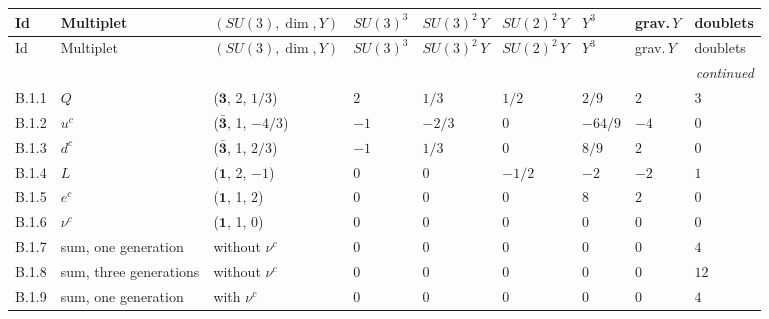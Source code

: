 {\scriptsize\setlength{\tabcolsep}{3pt}
\begin{longtable}{@{}lllllllll@{}}
\toprule
Id & Multiplet & $(SU(3),\dim, Y)$ & $SU(3)^3$ & $SU(3)^2\,Y$ & $SU(2)^2\,Y$ & $Y^3$ & grav.$\,Y$ & doublets \\
\midrule\endfirsthead
\toprule
Id & Multiplet & $(SU(3),\dim, Y)$ & $SU(3)^3$ & $SU(3)^2\,Y$ & $SU(2)^2\,Y$ & $Y^3$ & grav.$\,Y$ & doublets \\
\midrule\endhead
\midrule\multicolumn{9}{r}{\emph{continued}}\\\endfoot
\bottomrule\endlastfoot
B.1.1 & $Q$ & ($\mathbf{3}$, 2, $1/3$) & $2$ & $1/3$ & $1/2$ & $2/9$ & $2$ & $3$ \\
B.1.2 & $u^c$ & ($\bar{\mathbf{3}}$, 1, $-4/3$) & $-1$ & $-2/3$ & $0$ & $-64/9$ & $-4$ & $0$ \\
B.1.3 & $d^c$ & ($\bar{\mathbf{3}}$, 1, $2/3$) & $-1$ & $1/3$ & $0$ & $8/9$ & $2$ & $0$ \\
B.1.4 & $L$ & ($\mathbf{1}$, 2, $-1$) & $0$ & $0$ & $-1/2$ & $-2$ & $-2$ & $1$ \\
B.1.5 & $e^c$ & ($\mathbf{1}$, 1, $2$) & $0$ & $0$ & $0$ & $8$ & $2$ & $0$ \\
B.1.6 & $\nu^c$ & ($\mathbf{1}$, 1, $0$) & $0$ & $0$ & $0$ & $0$ & $0$ & $0$ \\
B.1.7 & sum, one generation & without $\nu^c$ & $0$ & $0$ & $0$ & $0$ & $0$ & $4$ \\
B.1.8 & sum, three generations & without $\nu^c$ & $0$ & $0$ & $0$ & $0$ & $0$ & $12$ \\
B.1.9 & sum, one generation & with $\nu^c$ & $0$ & $0$ & $0$ & $0$ & $0$ & $4$ \\
\end{longtable}}
